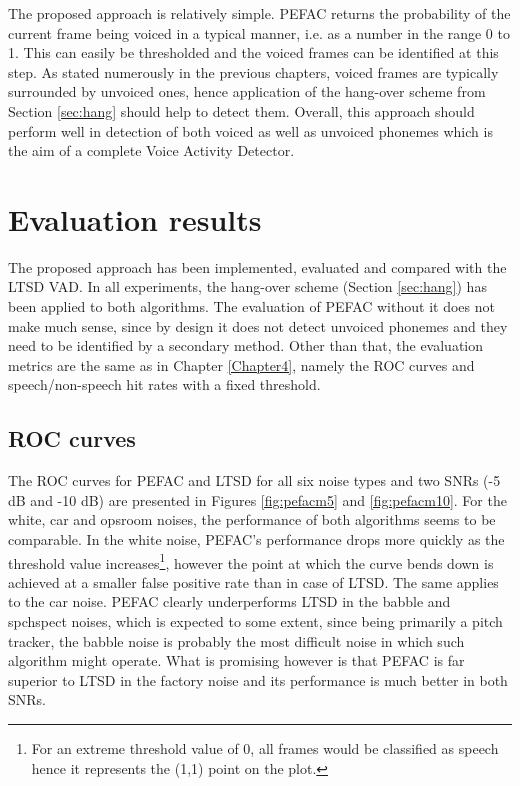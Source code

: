 The proposed approach is relatively simple. PEFAC returns the probability of the current frame being voiced in a typical manner, i.e. as a number in the range 0 to 1. This can easily be thresholded and the voiced frames can be identified at this step. As stated numerously in the previous chapters, voiced frames are typically surrounded by unvoiced ones, hence application of the hang-over scheme from Section \ref{sec:hang} should help to detect them. Overall, this approach should perform well in detection of both voiced as well as unvoiced phonemes which is the aim of a complete Voice Activity Detector.


\section{Evaluation results}

The proposed approach has been implemented, evaluated and compared with the LTSD VAD. In all experiments, the hang-over scheme (Section \ref{sec:hang}) has been applied to both algorithms. The evaluation of PEFAC without it does not make much sense, since by design it does not detect unvoiced phonemes and they need to be identified by a secondary method. Other than that, the evaluation metrics are the same as in Chapter \ref{Chapter4}, namely the ROC curves and speech/non-speech hit rates with a fixed threshold.


\subsection{ROC curves}

The ROC curves for PEFAC and LTSD for all six noise types and two SNRs (-5 dB and -10 dB) are presented in Figures \ref{fig:pefacm5} and \ref{fig:pefacm10}. For the white, car and opsroom noises, the performance of both algorithms seems to be comparable. In the white noise, PEFAC's performance drops more quickly as the threshold value increases\footnote{For an extreme threshold value of 0, all frames would be classified as speech hence it represents the (1,1) point on the plot.}, however the point at which the curve bends down is achieved at a smaller false positive rate than in case of LTSD. The same applies to the car noise. PEFAC clearly underperforms LTSD in the babble and spchspect noises, which is expected to some extent, since being primarily a pitch tracker, the babble noise is probably the most difficult noise in which such algorithm might operate. What is promising however is that PEFAC is far superior to LTSD in the factory noise and its performance is much better in both SNRs.

